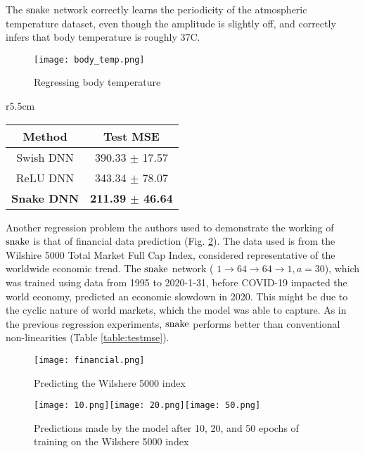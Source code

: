 The $ \operatorname{snake} $ network correctly learns the periodicity of the atmospheric temperature dataset, even though the amplitude is slightly off, and correctly infers that body temperature is roughly 37\degree C. \\

\begin{figure}[h]
  \begin{center}
    \texttt{[image: body\_temp.png]}
  \end{center}
  \caption{Regressing body temperature}
  \label{fig:body_temp}
\end{figure}

\newpage

\begin{wraptable}{r}{5.5cm}
  \begin{center}
\begin{tabular}{ |c|c| } 
 \hline
    Method & Test MSE \\
    \hline
    Swish DNN & 390.33 $\pm$ 17.57 \\
	ReLU DNN & 343.34 $\pm$ 78.07 \\
	\textbf{Snake DNN} & \textbf{211.39 $\pm$ 46.64} \\
 \hline
\end{tabular}
\end{center}
  \caption{Prediction of Wilshere 5000 index}
  \label{table:testmse}
\end{wraptable}

Another regression problem the authors used to demonstrate the working of $ \operatorname{snake} $ is that of financial data prediction (Fig. \ref{fig:financial}). The data used is from the Wilshire 5000 Total Market Full Cap Index, considered representative of the worldwide economic trend. The $ \operatorname{snake} $ network ( $ 1 \rightarrow 64 \rightarrow 64 \rightarrow 1, a = 30 $), which was trained using data from 1995 to 2020-1-31, before COVID-19 impacted the world economy, predicted an economic slowdown in 2020. This might be due to the cyclic nature of world markets, which the model was able to capture. As in the previous regression experiments, $ \operatorname{snake} $ performs better than conventional non-linearities (Table \ref{table:testmse}).

\begin{figure}[h]
  \centering
  \texttt{[image: financial.png]}
  \caption{Predicting the Wilshere 5000 index}
  \label{fig:financial}
\end{figure}

\begin{figure}[h]
  \centering
  \texttt{[image: 10.png]}\texttt{[image: 20.png]}\texttt{[image: 50.png]}
  \caption{Predictions made by the model after 10, 20, and 50 epochs of training on the Wilshere 5000 index }
  \label{fig:preds_fin}
\end{figure}

